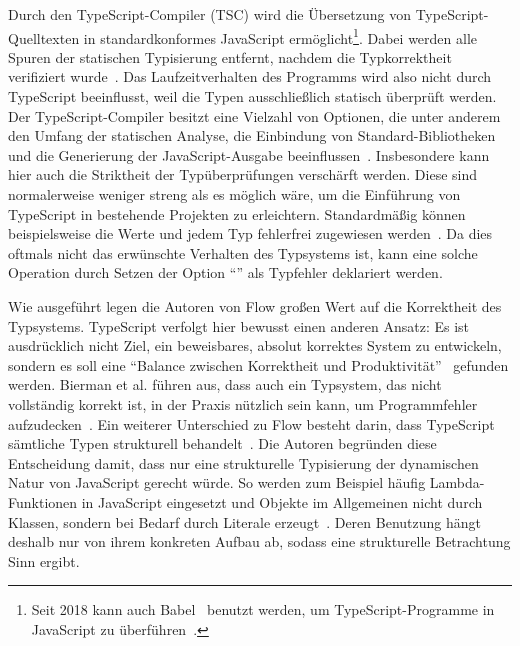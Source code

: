 Durch den TypeScript-Compiler (TSC) wird die Übersetzung von TypeScript-Quelltexten in standardkonformes JavaScript ermöglicht\footnote{Seit 2018 kann auch Babel~\autocite{BABEL} benutzt werden, um TypeScript-Programme in JavaScript zu überführen~\autocite{TYPESCRIPT:BABEL}.}. Dabei werden alle Spuren der statischen Typisierung entfernt, nachdem die Typkorrektheit verifiziert wurde~\autocite[3]{BIERMAN:2014}. Das Laufzeitverhalten des Programms wird also nicht durch TypeScript beeinflusst, weil die Typen ausschließlich statisch überprüft werden. Der TypeScript-Compiler besitzt eine Vielzahl von Optionen, die unter anderem den Umfang der statischen Analyse, die Einbindung von Standard-Bibliotheken und die Generierung der JavaScript-Ausgabe beeinflussen~\autocite{TSC:OPTIONS}. Insbesondere kann hier auch die Striktheit der Typüberprüfungen verschärft werden. Diese sind normalerweise weniger streng als es möglich wäre, um die Einführung von TypeScript in bestehende Projekten zu erleichtern. Standardmäßig können beispielsweise die Werte  und  jedem Typ fehlerfrei zugewiesen werden~\autocite{TSC:OPTIONS}. Da dies oftmals nicht das erwünschte Verhalten des Typsystems ist, kann eine solche Operation durch Setzen der Option \enquote{} als Typfehler deklariert werden.

Wie ausgeführt legen die Autoren von Flow großen Wert auf die Korrektheit des Typsystems. TypeScript verfolgt hier bewusst einen anderen Ansatz: Es ist ausdrücklich nicht Ziel, ein beweisbares, absolut korrektes System zu entwickeln, sondern es soll eine \enquote{Balance zwischen Korrektheit und Produktivität}~\autocite{TYPESCRIPT:DESIGN_GOALS} gefunden werden. Bierman et al. führen aus, dass auch ein Typsystem, das nicht vollständig korrekt ist, in der Praxis nützlich sein kann, um Programmfehler aufzudecken~\autocite[3]{BIERMAN:2014}. Ein weiterer Unterschied zu Flow besteht darin, dass TypeScript sämtliche Typen strukturell behandelt~\autocite[38]{TYPESCRIPT:SPEC}.
Die Autoren begründen diese Entscheidung damit, dass nur eine strukturelle Typisierung der dynamischen Natur von JavaScript gerecht würde. So werden zum Beispiel häufig Lambda-Funktionen in JavaScript eingesetzt und Objekte im Allgemeinen nicht durch Klassen, sondern bei Bedarf durch Literale erzeugt~\autocite[3]{BIERMAN:2014}. Deren Benutzung hängt deshalb nur von ihrem konkreten Aufbau ab, sodass eine strukturelle Betrachtung Sinn ergibt.

